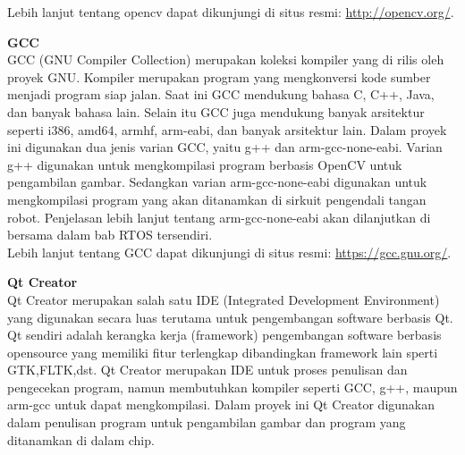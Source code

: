 \documentclass[11pt,fleqn]{book} %
\begin{document}
\begin{flushleft}
  \hspace{10pt} Lebih lanjut tentang opencv dapat dikunjungi di situs resmi: \url{http://opencv.org/}.
  
 \vspace{5pt}
 \textbf{GCC}\\
 \hspace{10pt} GCC (GNU Compiler Collection) merupakan koleksi kompiler yang di rilis oleh proyek GNU.
 Kompiler merupakan program yang mengkonversi kode sumber menjadi program siap jalan.
 Saat ini GCC mendukung bahasa C, C++, Java, dan banyak bahasa lain.
 Selain itu GCC juga mendukung banyak arsitektur seperti i386, amd64, armhf, arm-eabi, dan banyak arsitektur lain.
 Dalam proyek ini digunakan dua jenis varian GCC, yaitu g++ dan arm-gcc-none-eabi.
 Varian g++ digunakan untuk mengkompilasi program berbasis OpenCV untuk pengambilan gambar.
 Sedangkan varian arm-gcc-none-eabi digunakan untuk mengkompilasi program yang akan ditanamkan di sirkuit pengendali tangan robot.
 Penjelasan lebih lanjut tentang arm-gcc-none-eabi akan dilanjutkan di bersama dalam bab RTOS tersendiri.\\
 
 \hspace{10pt} Lebih lanjut tentang GCC dapat dikunjungi di situs resmi: \url{https://gcc.gnu.org/}.
 
 \vspace{5pt}
 \textbf{Qt Creator}\\
 \hspace{10pt} Qt Creator merupakan salah satu IDE (Integrated Development Environment) yang digunakan secara luas terutama untuk pengembangan software berbasis Qt.
 Qt sendiri adalah kerangka kerja (framework) pengembangan software berbasis opensource yang memiliki fitur terlengkap dibandingkan framework lain sperti GTK,FLTK,dst.
 Qt Creator merupakan IDE untuk proses penulisan dan pengecekan program, namun membutuhkan kompiler seperti GCC, g++, maupun arm-gcc untuk dapat mengkompilasi.
 Dalam proyek ini Qt Creator digunakan dalam penulisan program untuk pengambilan gambar dan program yang ditanamkan di dalam chip.
 

\end{flushleft}
\end{document}
